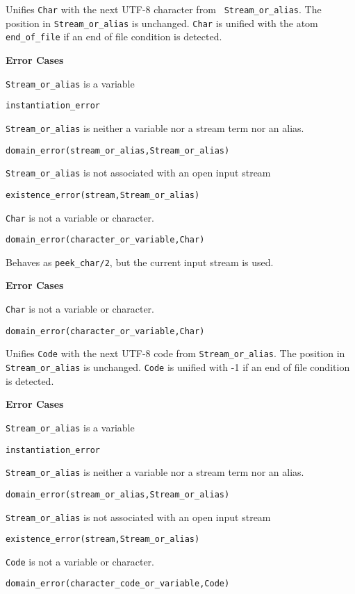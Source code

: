 \begin{description}


%
Unifies {\tt Char} with the next UTF-8 character from {\tt
  Stream\_or\_alias}.  The position in {\tt Stream\_or\_alias} is
unchanged.  {\tt Char} is unified with the atom {\tt end\_of\_file} if
an end of file condition is detected.

{\bf Error Cases}
\bi
\item 	{\tt Stream\_or\_alias} is a variable
\bi
\item {\tt instantiation\_error}
\ei
\item 	{\tt Stream\_or\_alias} is neither a variable nor a stream term nor an alias.
\bi
\item 	{\tt domain\_error(stream\_or\_alias,Stream\_or\_alias)}
\ei
\item 	{\tt Stream\_or\_alias} is not associated with an open input stream
\bi
\item 	{\tt existence\_error(stream,Stream\_or\_alias)}
\ei
\item 	{\tt Char} is not a variable or character.
\bi
\item 	{\tt domain\_error(character\_or\_variable,Char)}
\ei
\ei

%
Behaves as {\tt peek\_char/2}, but the current input stream is used.

{\bf Error Cases}
\bi
\item 	{\tt Char} is not a variable or character.
\bi
\item 	{\tt domain\_error(character\_or\_variable,Char)}
\ei
\ei

%
Unifies {\tt Code} with the next UTF-8 code from {\tt Stream\_or\_alias}.
The position in {\tt Stream\_or\_alias} is unchanged.  {\tt Code} is
unified with -1 if an end of file condition is detected.

{\bf Error Cases}
\bi
\item 	{\tt Stream\_or\_alias} is a variable
\bi
\item {\tt instantiation\_error}
\ei
\item 	{\tt Stream\_or\_alias} is neither a variable nor a stream term nor an alias.
\bi
\item 	{\tt domain\_error(stream\_or\_alias,Stream\_or\_alias)}
\ei
\item 	{\tt Stream\_or\_alias} is not associated with an open input stream
\bi
\item 	{\tt existence\_error(stream,Stream\_or\_alias)}
\ei
\item 	{\tt Code} is not a variable or character.
\bi
\item 	{\tt domain\_error(character\_code\_or\_variable,Code)}
\ei
\ei


\end{description}
